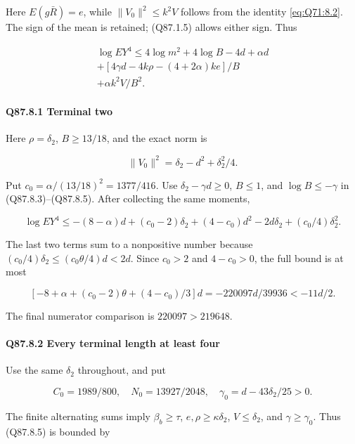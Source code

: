 Here \(E(g\bar R)=\allowbreak e\), while \(\|V_0\|^2\le\allowbreak  k^2V\) follows
from the identity \eqref{eq:Q71:8.2}. The sign of the mean
is retained; (Q87.1.5) allows either sign. Thus

\[
\begin{gathered}
\log EY^4\le4\log m^2+4\log B-4d+\alpha d\\
+[4\gamma d-4k\rho-(4+2\alpha)ke]/B\\
+\alpha k^2V/B^2.
\end{gathered}\tag{Q87.8.5}\label{eq:Q87:8.5}
\]

\paragraph{Q87.8.1 Terminal two}\label{part:Q87.8.1}

Here \(\rho=\allowbreak \delta_2\), \(B\ge\allowbreak 13/18\), and the exact norm is

\[
 \|V_0\|^2=\delta_2-d^2+\delta_2^2/4.
\]

Put \(c_0=\allowbreak \alpha/(13/18)^2=\allowbreak 1377/416\).
Use \(\delta_2-\gamma d\ge\allowbreak 0\), \(B\le\allowbreak 1\), and \(\log B\le\allowbreak -\gamma\)
in (Q87.8.3)–(Q87.8.5). After collecting the same moments,

\[
 \log EY^4\le-(8-\alpha)d+(c_0-2)\delta_2+(4-c_0)d^2
 -2d\delta_2+(c_0/4)\delta_2^2.
\]

The last two terms sum to a nonpositive number because
\((c_0/4)\delta_2\le\allowbreak (c_0\theta/4)d<\allowbreak 2d\).
Since \(c_0>\allowbreak 2\) and \(4-c_0>\allowbreak 0\), the full bound is at most

\[
 [-8+\alpha+(c_0-2)\theta+(4-c_0)/3]d
 =-220097d/39936<-11d/2.
 \tag{Q87.8.6}\label{eq:Q87:8.6}
\]

The final numerator comparison is \(220097>\allowbreak 219648\).

\paragraph{Q87.8.2 Every terminal length at least four}\label{part:Q87.8.2}

Use the same \(\delta_2\) throughout, and put

\[
 C_0=1989/800,\quad N_0=13927/2048,\quad
 \gamma_0=d-43\delta_2/25>0.
\]

The finite alternating sums imply
\(\beta_b\ge\allowbreak \tau\), \(e,\allowbreak  \rho\ge\allowbreak \kappa \delta_2\),
\(V\le\allowbreak  \delta_2\), and \(\gamma\ge\allowbreak \gamma_0\).
Thus (Q87.8.5) is bounded by


